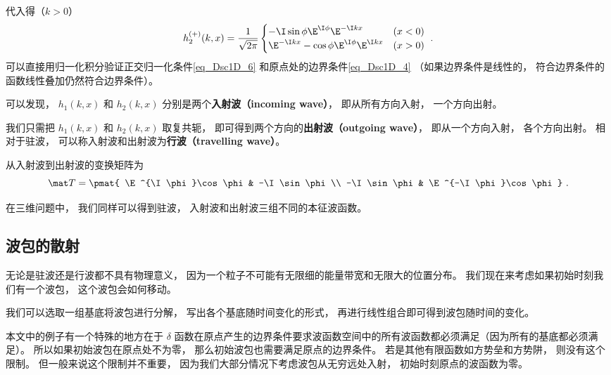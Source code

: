 代入得（$k > 0$）
\begin{equation}\label{eq_Dsc1D_13}
h_2^{(+)}(k, x) =  \frac{1}{\sqrt{2\pi}}
\begin{cases}
-\I\sin\phi\E^{\I\phi}\E^{-\I kx} &(x < 0) \\
\E^{-\I kx} - \cos\phi \E^{\I \phi} \E^{\I kx} &(x > 0)
\end{cases}~.
\end{equation}
可以直接用归一化积分验证正交归一化条件\autoref{eq_Dsc1D_6} 和原点处的边界条件\autoref{eq_Dsc1D_4} （如果边界条件是线性的， 符合边界条件的函数线性叠加仍然符合边界条件）。

可以发现， $h_1(k, x)$ 和 $h_2(k, x)$ 分别是两个\textbf{入射波（incoming wave）}， 即从所有方向入射， 一个方向出射。

我们只需把 $h_1(k, x)$ 和 $h_2(k, x)$ 取复共轭， 即可得到两个方向的\textbf{出射波（outgoing wave）}， 即从一个方向入射， 各个方向出射。 相对于驻波， 可以称入射波和出射波为\textbf{行波（travelling wave）}。

从入射波到出射波的变换矩阵为
\begin{equation}
\mat T = \pmat{
\E^{\I\phi}\cos\phi & -\I \sin\phi \\
-\I \sin\phi & \E^{-\I\phi}\cos\phi
}~.\end{equation}

在三维问题中， 我们同样可以得到驻波， 入射波和出射波三组不同的本征波函数。

\subsection{波包的散射}
无论是驻波还是行波都不具有物理意义， 因为一个粒子不可能有无限细的能量带宽和无限大的位置分布。 我们现在来考虑如果初始时刻我们有一个波包， 这个波包会如何移动。

我们可以选取一组基底将波包进行分解， 写出各个基底随时间变化的形式， 再进行线性组合即可得到波包随时间的变化。

本文中的例子有一个特殊的地方在于 $\delta$ 函数在原点产生的边界条件要求波函数空间中的所有波函数都必须满足（因为所有的基底都必须满足）。 所以如果初始波包在原点处不为零， 那么初始波包也需要满足原点的边界条件。 若是其他有限函数如方势垒和方势阱， 则没有这个限制。 但一般来说这个限制并不重要， 因为我们大部分情况下考虑波包从无穷远处入射， 初始时刻原点的波函数为零。


